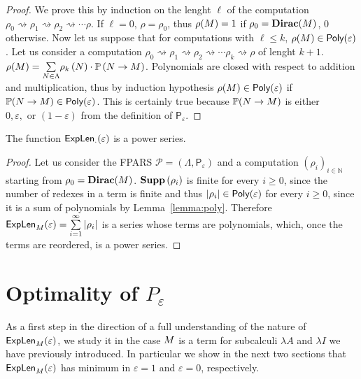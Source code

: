 \begin{proof}
	We prove this by induction on the lenght $\ell$ of the computation $\rho_0\rightsquigarrow\rho_1\rightsquigarrow\rho_2\rightsquigarrow\cdots\rho$. If $\ell=0$, $\rho=\rho_0$, thus $\rho(M)=1$ if $\rho_0=\textbf{Dirac}(M)$, $0$ otherwise. Now let us suppose that for computations with $\ell\leq k$, $\rho(M)\in \textsf{Poly}(\varepsilon)$. Let us consider a computation $ \rho_0\rightsquigarrow\rho_1\rightsquigarrow \rho_2\rightsquigarrow\cdots\rho_{k}\rightsquigarrow\rho$ of lenght $k+1$. $\rho(M)=\underset{N\in\Lambda}{\sum}\rho_{k}\left( N\right) \cdot\mathbb{P}\left(N \rightarrow M\right)$. Polynomials are closed with respect to addition and multiplication, thus by induction hypothesis $\rho(M)\in\textsf{Poly}(\varepsilon)$ if $\mathbb{P}(N \rightarrow M)\in\textsf{Poly}(\varepsilon)$. This is certainly true because $\mathbb{P}(N \rightarrow M)$ is either $0,\varepsilon,\textrm{ or }(1-\varepsilon)$ from the definition of $\mathsf{P}_{\varepsilon}$.
\end{proof}
\begin{theorem}
	The function $\textsf{ExpLen}_{\cdot}(\varepsilon)$ is a power series.
\end{theorem}
\begin{proof}
	Let us consider the FPARS $\mathcal{P}=\left(\Lambda,\mathsf{P}_{\varepsilon}\right)$ and a computation $(\rho_i)_{i\in\mathbb{N}}$ starting from $\rho_0=\textbf{Dirac}(M)$. $\textbf{Supp}\left(\rho_i\right)$
	is finite for every $i\geq 0$, since the number of redexes in a term is finite and thus $|\rho_i|\in\textsf{Poly}(\varepsilon)$ for every $i\geq 0$, since it is a sum of polynomials by Lemma~\ref{lemma:poly}. Therefore $\textsf{ExpLen}_{M}(\varepsilon)=\sum\limits_{i=1}^{\infty} |\rho_i|$ is a series whose terms are polynomials, which, once the terms are reordered, is a power series.
\end{proof}
\section{Optimality of $P_\varepsilon$}
As a first step in the direction of a full understanding of the nature
of $\textsf{ExpLen}_{M}(\varepsilon)$, we study it in the
case $M$ is a term for subcalculi $\lambda A$ and
$\lambda I$ we have previously introduced. In particular we show in the
next two sections that $\textsf{ExpLen}_{M}(\varepsilon)$ has minimum
in $\varepsilon=1$ and $\varepsilon=0$, respectively.
